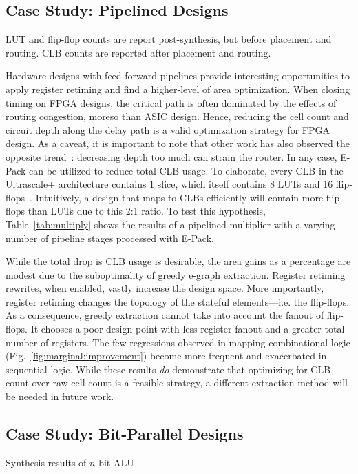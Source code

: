 \subsection{Case Study: Pipelined Designs}\label{sec:results:retiming}
\begin{table}[t]
    \centering
    \caption{LUT and flip-flop counts are report post-synthesis, but before placement and routing. CLB counts are reported after placement and routing.}\label{tab:multiply}
\end{table}

Hardware designs with feed forward pipelines provide interesting opportunities
to apply register retiming and find a higher-level of area optimization. When
closing timing on FPGA designs, the critical path is often dominated by the
effects of routing congestion, moreso than ASIC design. Hence, reducing the
cell count and circuit depth along the delay path is a valid optimization
strategy for FPGA design. As a caveat, it is important to note that other work
has also observed the opposite trend~\cite{academicfpga}: decreasing depth too
much can strain the router. In any case, E-Pack can be utilized to reduce total
CLB usage. To elaborate, every CLB in the Ultrascale+ architecture contains 1
slice, which itself contains 8 LUTs and 16 flip-flops~\cite{ug574}.
Intuitively, a design that maps to CLBs efficiently will contain more
flip-flops than LUTs due to this 2:1 ratio. To test this hypothesis,
Table~\ref{tab:multiply} shows the results of a pipelined multiplier with a
varying number of pipeline stages processed with E-Pack.

While the total drop is CLB usage is desirable, the area gains as a percentage
are modest due to the suboptimality of greedy e-graph extraction. Register
retiming rewrites, when enabled, vastly increase the design space. More
importantly, register retiming changes the topology of the stateful
elements---i.e. the flip-flops. As a consequence, greedy extraction cannot take
into account the fanout of flip-flops. It chooses a poor design point with less
register fanout and a greater total number of registers. The few regressions
observed in mapping combinational logic (Fig.~\ref{fig:marginal:improvement})
become more frequent and exacerbated in sequential logic. While these results
\textit{do} demonstrate that optimizing for CLB count over raw cell count is a
feasible strategy, a different extraction method will be needed in future work.

\subsection{Case Study: Bit-Parallel Designs}\label{sec:results:scalability}
\begin{table}
    \centering
    \caption{Synthesis results of $n$-bit ALU}\label{tab:alu}
\end{table}
